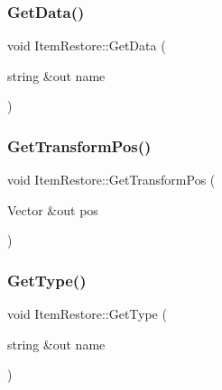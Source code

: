 \hypertarget{class_item_restore_a27c36113481bf5a46c506b23993f3bc2}{}\label{class_item_restore_a27c36113481bf5a46c506b23993f3bc2} 
\subsubsection{\texorpdfstring{Get\+Data()}{GetData()}}
{\footnotesize\ttfamily void Item\+Restore\+::\+Get\+Data (\begin{DoxyParamCaption}\item[{string \&out}]{name }\end{DoxyParamCaption})}

\hypertarget{class_item_restore_a9e5489ca1ea60e13bcf62385bc6df782}{}\label{class_item_restore_a9e5489ca1ea60e13bcf62385bc6df782} 
\subsubsection{\texorpdfstring{Get\+Transform\+Pos()}{GetTransformPos()}}
{\footnotesize\ttfamily void Item\+Restore\+::\+Get\+Transform\+Pos (\begin{DoxyParamCaption}\item[{Vector \&out}]{pos }\end{DoxyParamCaption})}

\hypertarget{class_item_restore_a7adf97306013f8ed34a91d9f5f152ea5}{}\label{class_item_restore_a7adf97306013f8ed34a91d9f5f152ea5} 
\subsubsection{\texorpdfstring{Get\+Type()}{GetType()}}
{\footnotesize\ttfamily void Item\+Restore\+::\+Get\+Type (\begin{DoxyParamCaption}\item[{string \&out}]{name }\end{DoxyParamCaption})}

\hypertarget{class_item_restore_a4e85d53e9f8026b9ad91fd0a42b59464}{}\label{class_item_restore_a4e85d53e9f8026b9ad91fd0a42b59464} 
